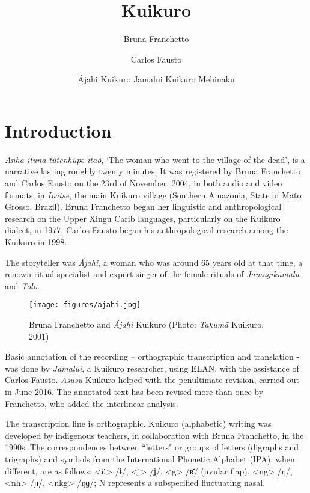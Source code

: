 \documentclass[output=paper,
modfonts,nonflat
]{langsci/langscibook}
\author{Bruna Franchetto\affiliation{Museu Nacional, Federal University of Rio de Janeiro, Brazil}%
\and Carlos Fausto\affiliation{Museu Nacional, Federal University of Rio de Janeiro, Brazil}%
\and Ájahi Kuikuro%
\lastand Jamalui Kuikuro Mehinaku%
}%
\title{Kuikuro}
\begin{document}
\section{Introduction}
\emph{Anha ituna tütenhüpe itaõ}, ‘The woman who went to the village of the dead’, is a narrative lasting roughly twenty minutes. It was registered by Bruna Franchetto and Carlos Fausto on the 23rd of November, 2004, in both audio and video formats, in \emph{Ipatse}, the main Kuikuro village (Southern Amazonia, State of Mato Grosso, Brazil). Bruna Franchetto began her linguistic and anthropological research on the Upper Xingu Carib languages, particularly on the Kuikuro dialect, in 1977. Carlos Fausto began his anthropological research among the Kuikuro in 1998.

The storyteller was \emph{Ájahi}, a woman who was around 65 years old at that time, a renown ritual specialist and expert singer of the female rituals of \emph{Jamugikumalu} and \emph{Tolo}.

\begin{figure}[h!]
  \caption{Bruna Franchetto and \emph{Ájahi} Kuikuro (Photo: \emph{Takumã} Kuikuro, 2001)}
  \centering
\texttt{[image: figures/ajahi.jpg]}
\end{figure}

Basic annotation of the recording – orthographic transcription and translation - was done by \emph{Jamalui}, a Kuikuro researcher, using ELAN, with the assistance of Carlos Fausto. \emph{Asusu} Kuikuro helped with the penultimate revision, carried out in June 2016. The annotated text has been revised more than once by Franchetto, who added the interlinear analysis.

The transcription line is orthographic. Kuikuro (alphabetic) writing was developed by 
indigenous teachers, in collaboration with Bruna Franchetto, in the 1990s. The correspondences between “letters" or groups of letters (digraphs and trigraphs) and symbols from the International Phonetic Alphabet (IPA), when different, are as follows: <ü> /ɨ/, <j> /ʝ/, <g> /ʀ̆/ (uvular flap), <ng> /ŋ/, <nh> /ɲ/, <nkg> /ŋɡ/; N represents a subspecified fluctuating nasal.
\end{document}
